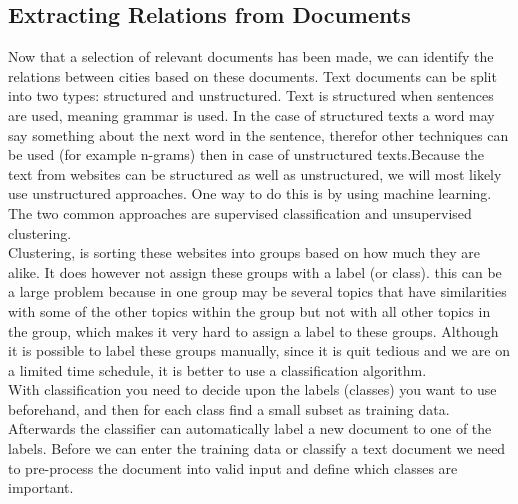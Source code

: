 \subsection{Extracting Relations from Documents}
Now that a selection of relevant documents has been made, we can identify the relations between cities based on these documents. Text documents can be split into two types: structured and unstructured. Text is structured when sentences are used, meaning grammar is used. In the case of structured texts a word may say something about the next word in the sentence, therefor other techniques can be used (for example n-grams) then in case of unstructured texts.Because the text from websites can be structured as well as unstructured, we will most likely use unstructured approaches. One way to do this is by using machine learning. The two common approaches are supervised classification and unsupervised clustering. \\

Clustering, is sorting these websites into groups based on how much they are alike. It does however not assign these groups with a label (or class). this can be a large problem because in one group may be several topics that have similarities with some of the other topics within the group but not with all other topics in the group, which makes it very hard to assign a label to these groups. Although it is possible to label these groups manually, since it is quit tedious and we are on a limited time schedule, it is better to use a classification algorithm. \\

With classification you need to decide upon the labels (classes) you want to use beforehand, and then for each class find a small subset as training data. Afterwards the classifier can automatically label a new document to one of the labels. Before we can enter the training data or classify a text document we need to pre-process the document into valid input and define which classes are important.

